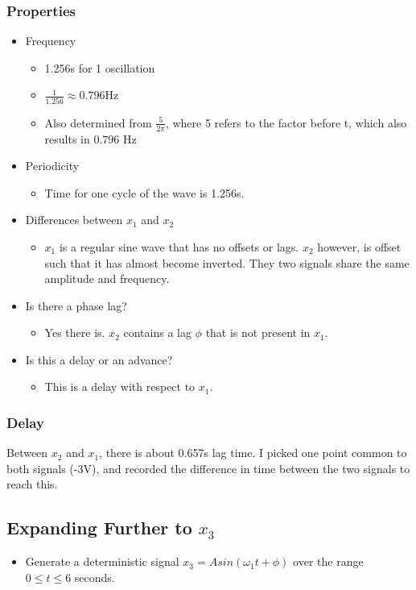 \documentclass[12pt]{article}
\begin{document}
\subsubsection{Properties}
\begin{itemize}
\item Frequency
\begin{itemize}
\item 1.256s for 1 oscillation
\item $\frac{1}{1.256} \approx 0.796$Hz
\item Also determined from $\frac{5}{2\pi}$, where 5 refers to the factor before t, which also results in $0.796$ Hz
\end{itemize}
\item Periodicity
\begin{itemize}
\item Time for one cycle of the wave is 1.256s.
\end{itemize}
\item Differences between $x_1$ and $x_2$
\begin{itemize}
\item $x_1$ is a regular sine wave that has no offsets or lags. $x_2$ however, is offset such that it has almost become inverted. They two signals share the same amplitude and frequency.
\end{itemize}
\item Is there a phase lag?
\begin{itemize}
\item Yes there is. $x_2$ contains a lag $\phi$ that is not present in $x_1$.
\end{itemize}
\item Is this a delay or an advance?
\begin{itemize}
\item This is a delay with respect to $x_1$.
\end{itemize}
\end{itemize}

\subsubsection{Delay}
Between $x_2$ and $x_1$, there is about 0.657s lag time. I picked one point common to both signals (-3V), and recorded the difference in time between the two signals to reach this. 

\subsection{Expanding Further to $x_3$}
\begin{itemize}
\item Generate a deterministic signal $x_3=Asin(\omega_{1}t + \phi)$ over the range $0 \leq t \leq 6$ seconds.
\end{itemize}
\end{document}
